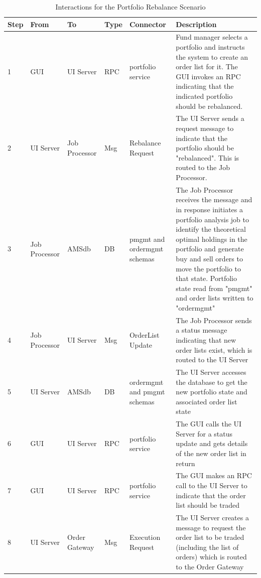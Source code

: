 \begin{table}
\caption{Interactions for the Portfolio Rebalance Scenario}
\label{table:amsinteractions}
\footnotesize
\begin{tabular}{l l l l p{2cm} p{5cm}}
Step & From & To & Type & Connector & Description \\
\hline

1 & GUI & UI Server & RPC & portfolio service & Fund manager selects a portfolio and instructs the system to create an order list for it.  The GUI invokes an RPC indicating that the indicated portfolio should be rebalanced. \\

2 & UI Server & Job Processor & Msg & Rebalance Request & The UI Server sends a request message to indicate that the portfolio should be "rebalanced".  This is routed to the Job Processor. \\

3 & Job Processor & AMSdb & DB & pmgmt and ordermgmt schemas & The Job Processor receives the message and in response initiates a portfolio analysis job to identify the theoretical optimal holdings in the portfolio and generate buy and sell orders to move the portfolio to that state.  Portfolio state read from "pmgmt" and order lists written to "ordermgmt" \\

4 & Job Processor & UI Server & Msg & OrderList Update & The Job Processor sends a status message indicating that new order lists exist, which is routed to the UI Server \\

5 & UI Server & AMSdb & DB & ordermgmt and pmgmt schemas & The UI Server accesses the database to get the new portfolio state and associated order list state \\

6 & GUI & UI Server & RPC & portfolio service & The GUI calls the UI Server for a status update and gets details of the new order list in return \\

7 & GUI & UI Server & RPC & portfolio service & The GUI makes an RPC call to the UI Server to indicate that the order list should be traded \\

8 & UI Server & Order Gateway & Msg & Execution Request & The UI Server creates a message to request the order list to be traded (including the list of orders) which is routed to the Order Gateway \\


\end{tabular}
\end{table}
